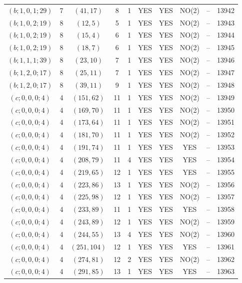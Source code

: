 \begin{longtable}{|c|c|c|c|c|c|c|c|c|c|}
$(b; 1, 0, 1; 29)$ & 7 & $(41, 17)$ & 8 & 1 & YES & YES & NO(2) & -- & 13942\\
$(b; 1, 0, 2; 19)$ & 8 & $(12, 5)$ & 5 & 1 & YES & YES & NO(2) & -- & 13943\\
$(b; 1, 0, 2; 19)$ & 8 & $(15, 4)$ & 6 & 1 & YES & YES & NO(2) & -- & 13944\\
$(b; 1, 0, 2; 19)$ & 8 & $(18, 7)$ & 6 & 1 & YES & YES & NO(2) & -- & 13945\\
$(b; 1, 1, 1; 39)$ & 8 & $(23, 10)$ & 7 & 1 & YES & YES & NO(2) & -- & 13946\\
$(b; 1, 2, 0; 17)$ & 8 & $(25, 11)$ & 7 & 1 & YES & YES & NO(2) & -- & 13947\\
$(b; 1, 2, 0; 17)$ & 8 & $(39, 11)$ & 9 & 1 & YES & YES & NO(2) & -- & 13948\\
$(c; 0, 0, 0; 4)$ & 4 & $(151, 62)$ & 11 & 1 & YES & YES & NO(2) & -- & 13949\\
$(c; 0, 0, 0; 4)$ & 4 & $(169, 70)$ & 11 & 1 & YES & YES & NO(2) & -- & 13950\\
$(c; 0, 0, 0; 4)$ & 4 & $(173, 64)$ & 11 & 1 & YES & YES & NO(2) & -- & 13951\\
$(c; 0, 0, 0; 4)$ & 4 & $(181, 70)$ & 11 & 1 & YES & YES & NO(2) & -- & 13952\\
$(c; 0, 0, 0; 4)$ & 4 & $(191, 74)$ & 11 & 1 & YES & YES & YES & -- & 13953\\
$(c; 0, 0, 0; 4)$ & 4 & $(208, 79)$ & 11 & 4 & YES & YES & YES & -- & 13954\\
$(c; 0, 0, 0; 4)$ & 4 & $(219, 65)$ & 12 & 1 & YES & YES & YES & -- & 13955\\
$(c; 0, 0, 0; 4)$ & 4 & $(223, 86)$ & 13 & 1 & YES & YES & NO(2) & -- & 13956\\
$(c; 0, 0, 0; 4)$ & 4 & $(225, 98)$ & 12 & 1 & YES & YES & NO(2) & -- & 13957\\
$(c; 0, 0, 0; 4)$ & 4 & $(233, 89)$ & 11 & 1 & YES & YES & YES & -- & 13958\\
$(c; 0, 0, 0; 4)$ & 4 & $(243, 89)$ & 12 & 1 & YES & YES & NO(2) & -- & 13959\\
$(c; 0, 0, 0; 4)$ & 4 & $(244, 55)$ & 13 & 4 & YES & YES & NO(2) & -- & 13960\\
$(c; 0, 0, 0; 4)$ & 4 & $(251, 104)$ & 12 & 1 & YES & YES & YES & -- & 13961\\
$(c; 0, 0, 0; 4)$ & 4 & $(274, 81)$ & 12 & 2 & YES & YES & NO(2) & -- & 13962\\
$(c; 0, 0, 0; 4)$ & 4 & $(291, 85)$ & 13 & 1 & YES & YES & YES & -- & 13963\\

\end{longtable}
